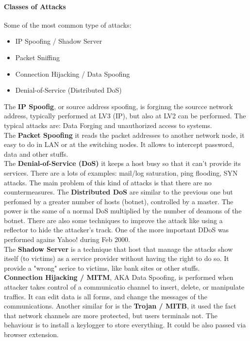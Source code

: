 \documentclass[12pt]{article}
\begin{document}
\paragraph{Classes of Attacks} Some of the most common type of attacks:
\begin{itemize}
  \item IP Spoofing / Shadow Server
  \item Packet Sniffing
  \item Connection Hijacking / Data Spoofing
  \item Denial-of-Service (Distributed DoS)
\end{itemize}
The \textbf{IP Spoofig}, or source address spoofing, is forginng the sourcce network address, typically performed at LV3 (IP), but also at LV2 can be performed. The typical attacks are: Data Forging and unauthorized access to systems.\\
The \textbf{Packet Spoofing} it reads the packet addresses to another network node, it easy to do in LAN or at the switching nodes. It allows to intercept password, data and other stuffs.\\
The \textbf{Denial-of-Service (DoS)} it keeps a host busy so that it can't provide its services. There are a lots of examples: mail/log saturation, ping flooding, SYN attacks. The main problem of this kind of attacks is that there are no countermeasures. The \textbf{Distributed DoS} are similar to the previous one but perfomed by a greater number of hosts (botnet), controlled by a master. The power is the same of a normal DoS multiplied by the number of deamons of the botnet. There are also some techniques to improve the attack like using a reflector to hide the attacker's track. One of the more important DDoS was performed agains Yahoo! during Feb 2000.\\
The \textbf{Shadow Server} is a technique that host that manage the attacks show itself (to victims) as a service provider without having the right to do so. It provide a "wrong" serice to victims, like bank sites or other stuffs.\\
\textbf{Connection Hijacking / MITM}, AKA Data Spoofing, is performed when attacker takes control of a communicatio channel to insert, delete, or manipulate traffics. It can edit data is all forms, and change the messages of the communications. Another similar for is the \textbf{Trojan / MITB}, it used the fact that network channels are more protected, but users terminals not. The behaviour is to install a keylogger to store everything. It could be also passed via browser extension.\\
\end{document}
